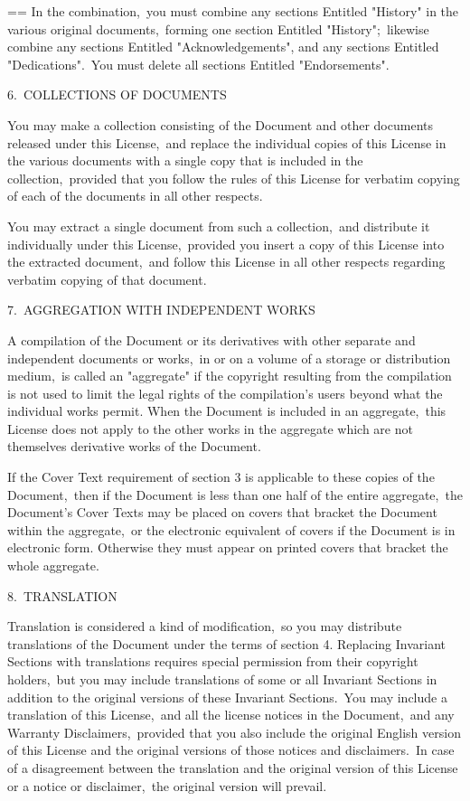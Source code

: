 \documentclass{book}
\makeatletter
\newenvironment{Texinfopreformatted}{%
  \par\GNUTobeylines\obeyspaces\frenchspacing\parskip=\z@\parindent=\z@}{}
{\catcode`\^^M=13 \gdef\GNUTobeylines{\catcode`\^^M=13 \def^^M{\null\par}}}
\newenvironment{Texinfoindented}{\begin{list}{}{}\item\relax}{\end{list}}
\renewcommand{\_}{\Texinfounderscore\discretionary{}{}{}}
\makeatother
\begin{document}
\begin{Texinfoindented}
\begin{Texinfopreformatted}
In the combination,\ you must combine any sections Entitled "History"
in the various original documents,\ forming one section Entitled
"History";\ likewise combine any sections Entitled "Acknowledgements",
and any sections Entitled "Dedications".\  You must delete all sections
Entitled "Endorsements".


6.\ COLLECTIONS OF DOCUMENTS

You may make a collection consisting of the Document and other
documents released under this License,\ and replace the individual
copies of this License in the various documents with a single copy
that is included in the collection,\ provided that you follow the rules
of this License for verbatim copying of each of the documents in all
other respects.

You may extract a single document from such a collection,\ and
distribute it individually under this License,\ provided you insert a
copy of this License into the extracted document,\ and follow this
License in all other respects regarding verbatim copying of that
document.


7.\ AGGREGATION WITH INDEPENDENT WORKS

A compilation of the Document or its derivatives with other separate
and independent documents or works,\ in or on a volume of a storage or
distribution medium,\ is called an "aggregate" if the copyright
resulting from the compilation is not used to limit the legal rights
of the compilation's users beyond what the individual works permit.
When the Document is included in an aggregate,\ this License does not
apply to the other works in the aggregate which are not themselves
derivative works of the Document.

If the Cover Text requirement of section 3 is applicable to these
copies of the Document,\ then if the Document is less than one half of
the entire aggregate,\ the Document's Cover Texts may be placed on
covers that bracket the Document within the aggregate,\ or the
electronic equivalent of covers if the Document is in electronic form.
Otherwise they must appear on printed covers that bracket the whole
aggregate.


8.\ TRANSLATION

Translation is considered a kind of modification,\ so you may
distribute translations of the Document under the terms of section 4.
Replacing Invariant Sections with translations requires special
permission from their copyright holders,\ but you may include
translations of some or all Invariant Sections in addition to the
original versions of these Invariant Sections.\  You may include a
translation of this License,\ and all the license notices in the
Document,\ and any Warranty Disclaimers,\ provided that you also include
the original English version of this License and the original versions
of those notices and disclaimers.\  In case of a disagreement between
the translation and the original version of this License or a notice
or disclaimer,\ the original version will prevail.


\end{Texinfopreformatted}
\end{Texinfoindented}
\end{document}
